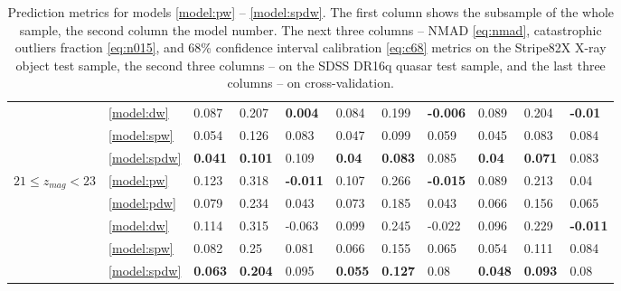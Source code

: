 \documentclass[fleqn,usenatbib]{mnras}
\begin{document}
\begin{table}
\begin{tabular}{lllllllllll}
                                   & \ref{model:dw} &                0.087 &           0.207 &   \textbf{0.004} &            0.084 &           0.199 &  \textbf{-0.006} &            0.089 &           0.204 &   \textbf{-0.01} \\
                                   & \ref{model:spw} &                0.054 &           0.126 &            0.083 &            0.047 &           0.099 &            0.059 &            0.045 &           0.083 &            0.084 \\
                                   & \ref{model:spdw} &       \textbf{0.041} &  \textbf{0.101} &            0.109 &    \textbf{0.04} &  \textbf{0.083} &            0.085 &    \textbf{0.04} &  \textbf{0.071} &            0.083 \\
\hline
            $21 \leq z_{mag} < 23$ & \ref{model:pw} &                0.123 &           0.318 &  \textbf{-0.011} &            0.107 &           0.266 &  \textbf{-0.015} &            0.089 &           0.213 &             0.04 \\
                                   & \ref{model:pdw} &                0.079 &           0.234 &            0.043 &            0.073 &           0.185 &            0.043 &            0.066 &           0.156 &            0.065 \\
                                   & \ref{model:dw} &                0.114 &           0.315 &           -0.063 &            0.099 &           0.245 &           -0.022 &            0.096 &           0.229 &  \textbf{-0.011} \\
                                   & \ref{model:spw} &                0.082 &            0.25 &            0.081 &            0.066 &           0.155 &            0.065 &            0.054 &           0.111 &            0.084 \\
                                   & \ref{model:spdw} &       \textbf{0.063} &  \textbf{0.204} &            0.095 &   \textbf{0.055} &  \textbf{0.127} &             0.08 &   \textbf{0.048} &  \textbf{0.093} &             0.08 \\
\hline
            \hline
            \end{tabular}
            \caption{Prediction metrics for models \ref{model:pw} -- \ref{model:spdw}. The first column shows the subsample of the whole sample, the second column the model number. The next three columns -- NMAD \eqref{eq:nmad}, catastrophic outliers fraction \eqref{eq:n015}, and 68\% confidence interval calibration \eqref{eq:c68} metrics on the Stripe82X X-ray object test sample, the second three columns -- on the SDSS DR16q quasar test sample, and the last three columns -- on cross-validation.}
            \label{tab:total_metrics_table}
\end{table}
\end{document}
